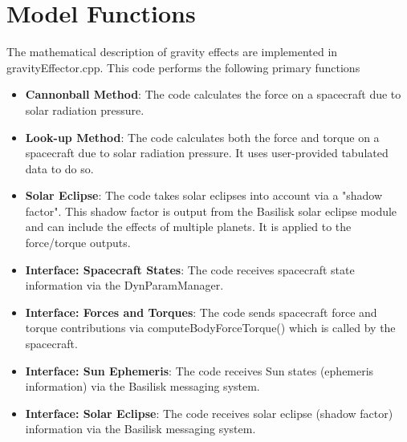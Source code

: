 \section{Model Functions}
The mathematical description of gravity effects are implemented in gravityEffector.cpp. This code performs the following primary functions
\begin{itemize}
	\item \textbf{Cannonball Method}: The code calculates the force on a spacecraft due to solar radiation pressure.
	\item \textbf{Look-up Method}: The code calculates both the force and torque on a spacecraft due to solar radiation pressure. It uses user-provided tabulated data to do so.
	\item \textbf{Solar Eclipse}: The code takes solar eclipses into account via a "shadow factor". This shadow factor is output from the Basilisk solar eclipse module and can include the effects of multiple planets. It is applied to the force/torque outputs.
	\item \textbf{Interface: Spacecraft States}: The code receives spacecraft state information via the DynParamManager.
	\item \textbf{Interface: Forces and Torques}: The code sends spacecraft force and torque contributions via computeBodyForceTorque() which is called by the spacecraft.	
	\item \textbf{Interface: Sun Ephemeris}: The code receives Sun states (ephemeris information) via the Basilisk messaging system.
	\item \textbf{Interface: Solar Eclipse}: The code receives solar eclipse (shadow factor) information via the Basilisk messaging system.
	
\end{itemize}



